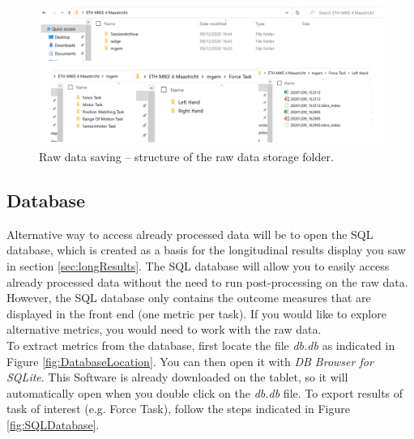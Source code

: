 \documentclass[10pt,oneside,a4paper]{article}
\begin{document}
\begin{figure}[h!]
\begin{center}
\includegraphics[width=\columnwidth]{images/TabletScreenshots/DataSaving.png}
\caption{Raw data saving – structure of the raw data storage folder.}
\label{fig:RawData}
\end{center}
\end{figure}

\subsection{Database}
Alternative way to access already processed data will be to open the SQL database, which is created as a basis for the longitudinal results display you saw in section \ref{sec:longResults}. The SQL database will allow you to easily access already processed data without the need to run post-processing on the raw data. However, the SQL database only contains the outcome measures that are displayed in the front end (one metric per task). If you would like to explore alternative metrics, you would need to work with the raw data. \\

To extract metrics from the database, first locate the file \emph{db.db} as indicated in Figure \ref{fig:DatabaseLocation}. You can then open it with \emph{DB Browser for SQLite}. This Software is already downloaded on the tablet, so it will automatically open when you double click on the \emph{db.db} file. To export results of task of interest (e.g. Force Task), follow the steps indicated in Figure \ref{fig:SQLDatabase}. 
\end{document}
